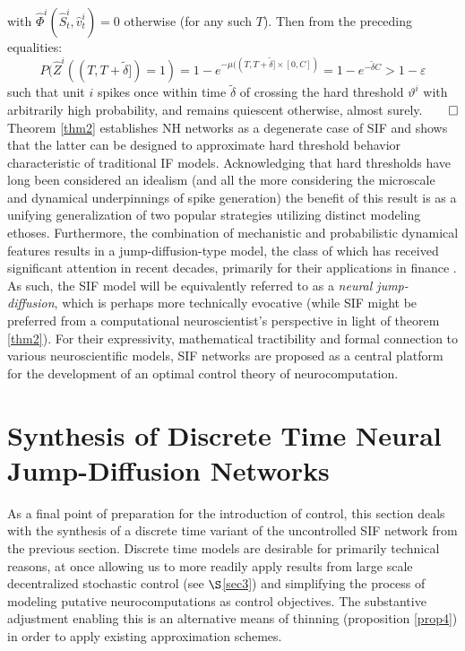 \documentclass[12pt, oneside]{report}
\newcommand{\1}[1]{\mathbbm{1}_{\{#1\}}}
\theoremstyle{definition}
\begin{document}
with $\hat{\Phi}^i(\hat{S}^i_t,\hat{v}^i_t)=0$ otherwise (for any such $T$).
Then from the preceding equalities:
\[P(\hat{Z}^i((T,T+\tilde{\delta}])=1)=1-e^{-\mu((T,T+\tilde{\delta}]\times[0,C])}=1-e^{-\tilde{\delta}C}>1-\varepsilon\]
such that unit $i$ spikes once within time $\tilde{\delta}$ of crossing the hard
threshold $\vartheta^i$ with arbitrarily high probability, and remains quiescent
otherwise, almost surely.\hfill{$\qed$}\\[5pt]
\indent Theorem \ref{thm2} establishes NH networks as a degenerate case of SIF
and shows that the latter can be designed to approximate hard threshold behavior
characteristic of traditional IF models. Acknowledging that hard thresholds
have long been considered an idealism \cite{Blair_Erlanger_1933} (and all the
more considering the microscale \cite{Faisal_Selen_Wolpert_2008} and dynamical
underpinnings \cite{Rinzel_Ermentrout_1998} of spike generation) the benefit of
this result is as a unifying generalization of two popular strategies utilizing
distinct modeling ethoses. Furthermore, the combination of mechanistic and
probabilistic dynamical features results in a jump-diffusion-type model, the
class of which has received significant attention in recent decades, primarily
for their applications in finance \cite{Jang_2007}. As such, the SIF model will be equivalently
referred to as a \textit{neural jump-diffusion}, which is perhaps more technically evocative (while SIF might be preferred from
a computational neuroscientist's perspective in light of theorem \ref{thm2}). For their expressivity,
mathematical tractibility and formal connection to various neuroscientific
models, SIF networks are proposed as a central platform for the development of an
optimal control theory of neurocomputation.
\section{Synthesis of Discrete Time Neural Jump-Diffusion Networks}\label{sec7}
As a final point of preparation for the introduction of control, this section deals with the synthesis of a discrete time variant of the uncontrolled SIF network from the previous section.
Discrete time models are desirable for primarily technical reasons, at once allowing us to more readily apply
results from large scale decentralized stochastic control (see $\S$\ref{sec3}) and 
simplifying the process of modeling putative neurocomputations as control objectives. The substantive adjustment
enabling this is an alternative means of thinning (proposition \ref{prop4}) in order to apply existing
approximation schemes. 
\end{document}
